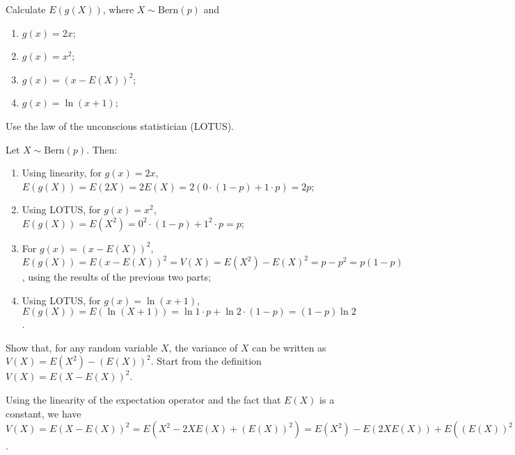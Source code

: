 \begin{exercise}
	Calculate $E(g(X))$, where $X\sim \text{Bern}(p)$ and 
	\begin{enumerate}
		\item $g(x)=2x$;
		\item $g(x)=x^2$;
		\item $g(x)=(x-E(X))^2$;
		\item $g(x)=\ln (x + 1)$;
	\end{enumerate}
	\begin{hint}
		Use the law of the unconscious statistician (LOTUS).
	\end{hint}
	\begin{solution}
	Let $X\sim \text{Bern}(p)$. Then:
		\begin{enumerate}
			\item Using linearity, for $g(x) = 2x$, $E(g(X)) = E(2X) = 2E(X) = 2(0 \cdot (1 - p) + 1 \cdot p) = 2p$;
			\item Using LOTUS, for $g(x) = x^2$, $E(g(X)) = E(X^2) = 0^2 \cdot (1 - p) + 1^2 \cdot p = p$;
			\item For $g(x) = (x - E(X))^2$, $E(g(X)) = E(x - E(X))^2 = V(X) = E(X^2) - E(X)^2 = p - p^2 = p(1 - p)$, using the results of the previous two parts;
			\item Using LOTUS, for $g(x) = \ln (x + 1)$, $E(g(X)) = E(\ln(X + 1)) = \ln 1 \cdot p + \ln 2 \cdot (1 - p) = (1 - p) \ln 2$.
		\end{enumerate}
	\end{solution}
\end{exercise}

\begin{exercise}\label{ex:chap04:08}
Show that, for any random variable $X$, the variance of $X$ can be written as $V(X) = E(X^2) - (E(X))^2$. Start from the definition $V(X) = E(X - E(X))^2$.
	\begin{solution}
	Using the linearity of the expectation operator and the fact that $E(X)$ is a constant, we have $V(X) = E(X - E(X))^2 = E(X^2 - 2X E(X) + (E(X))^2) = E(X^2) - E(2X E(X)) + E((E(X))^2) = E(X^2) - 2 E(X) E(X) - (E(X))^2 = E(X^2) - 2 (E(X))^2 + (E(X))^2 = E(X^2) - (E(X))^2$.
	\end{solution}
\end{exercise}


